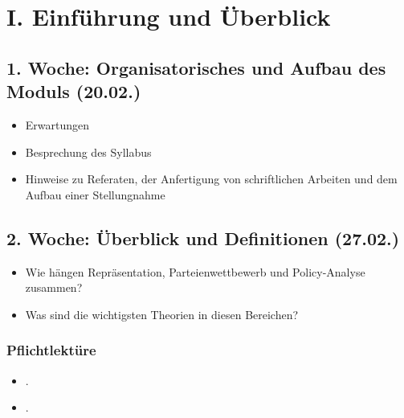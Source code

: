 \documentclass[abstract=on,parskip=full,headings=standardclasses,fontsize=11pt,paper=a4]{scrartcl}
\begin{document}
\renewcommand{\cftdot}{} %
\tableofcontents

\section{I. Einführung und Überblick}


\subsection{1. Woche: Organisatorisches und Aufbau des Moduls (20.02.)}

\begin{itemize}
\renewcommand\labelitemi{--}
\item Erwartungen
\item Besprechung des Syllabus
\item Hinweise zu Referaten, der Anfertigung von schriftlichen Arbeiten und dem Aufbau einer Stellungnahme
\end{itemize}

\subsection{2. Woche: Überblick  und Definitionen (27.02.)}

\begin{itemize}
\renewcommand\labelitemi{--}
\item Wie hängen Repräsentation, Parteienwettbewerb und Policy-Analyse zusammen?
\item Was sind die wichtigsten Theorien in diesen Bereichen?
\end{itemize}


\subsubsection*{Pflichtlektüre}
\begin{itemize}
\item {}.
\item {}.
\end{itemize}
\end{document}
